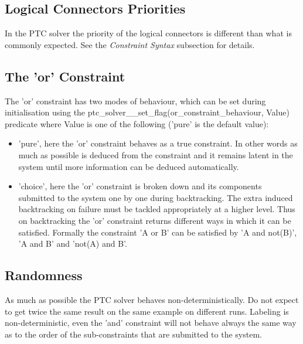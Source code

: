 \documentclass{article}
\begin{document}
\subsection{Logical Connectors Priorities}

In the PTC solver the priority of the logical connectors is different than what
is commonly expected. See the \textit{Constraint Syntax} subsection for details.

\subsection{The 'or' Constraint}

The 'or' constraint has two modes of behaviour, which can be set during
initialisation using the \linebreak
ptc\_solver\_\_set\_flag(or\_constraint\_behaviour, Value)
predicate where Value is one of the following ('pure' is the default value):

\begin{itemize}
\item 'pure', here the 'or' constraint behaves as a true constraint. In other
words as much as possible is deduced from the constraint and it
remains latent in the system until more information can be deduced
automatically.

\item 'choice', here the 'or' constraint is broken down and its components
submitted to the system one by one during backtracking. The extra
induced backtracking on failure must be tackled appropriately at a
higher level. Thus on backtracking the 'or' constraint returns
different ways in which it can be satisfied. Formally the
constraint 'A or B' can be satisfied by 'A and not(B)', 'A and B'
and 'not(A) and B'.

\end{itemize}

\subsection{Randomness}

As much as possible the PTC solver behaves non-deterministically. Do not expect
to get twice the same result on the same example on
different runs. Labeling is non-deterministic, even the 'and' constraint will not
behave always the same way as to the order of the
sub-constraints that are submitted to the system.

\end{document}
